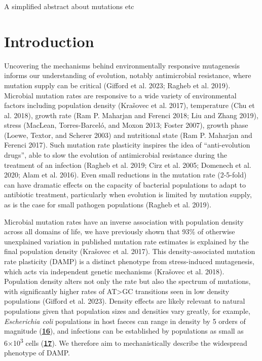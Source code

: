 \documentclass[
  12pt,
  letterpaper,
  DIV=11,
  numbers=noendperiod]{scrreprt}
\begin{document}
A simplified abstract about mutations etc


\hypertarget{introduction}{%
\chapter{Introduction}\label{introduction}}

Uncovering the mechanisms behind environmentally responsive mutagenesis
informs our understanding of evolution, notably antimicrobial
resistance, where mutation supply can be critical (Gifford et al. 2023;
Ragheb et al. 2019). Microbial mutation rates are responsive to a wide
variety of environmental factors including population density (Krašovec
et al. 2017), temperature (Chu et al. 2018), growth rate (Ram P.
Maharjan and Ferenci 2018; Liu and Zhang 2019), stress (MacLean,
Torres-Barceló, and Moxon 2013; Foster 2007), growth phase (Loewe,
Textor, and Scherer 2003) and nutritional state (Ram P. Maharjan and
Ferenci 2017). Such mutation rate plasticity inspires the idea of
``anti-evolution drugs'', able to slow the evolution of antimicrobial
resistance during the treatment of an infection (Ragheb et al. 2019;
Cirz et al. 2005; Domenech et al. 2020; Alam et al. 2016). Even small
reductions in the mutation rate (2-5-fold) can have dramatic effects on
the capacity of bacterial populations to adapt to antibiotic treatment,
particularly when evolution is limited by mutation supply, as is the
case for small pathogen populations (Ragheb et al. 2019).

Microbial mutation rates have an inverse association with population
density across all domains of life, we have previously shown that 93\%
of otherwise unexplained variation in published mutation rate estimates
is explained by the final population density (Krašovec et al. 2017).
This density-associated mutation rate plasticity (DAMP) is a distinct
phenotype from stress-induced mutagenesis, which acts via independent
genetic mechanisms (Krašovec et al. 2018). Population density alters not
only the rate but also the spectrum of mutations, with significantly
higher rates of AT\textgreater GC transitions seen in low density
populations (Gifford et al. 2023). Density effects are likely relevant
to natural populations given that population sizes and densities vary
greatly, for example, \emph{Escherichia coli} populations in host faeces
can range in density by 5 orders of magnitude
(\href{https://www.biorxiv.org/content/10.1101/2023.09.27.557722v1.full\#ref-16}{\textbf{16}}),
and infections can be established by populations as small as
6×10\textsuperscript{3} cells
(\href{https://www.biorxiv.org/content/10.1101/2023.09.27.557722v1.full\#ref-17}{\textbf{17}}).
We therefore aim to mechanistically describe the widespread phenotype of
DAMP.
\end{document}
